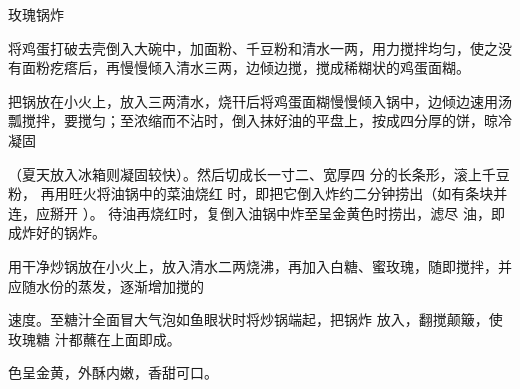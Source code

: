 \begin{recipe}{玫瑰锅炸}

\ingredients


\preparation

\step 将鸡蛋打破去壳倒入大碗中，加面粉、千豆粉和清水一两，用力搅拌均匀，使之没
有面粉疙瘩后，再慢慢倾入清水三两，边倾边搅，搅成稀糊状的鸡蛋面糊。

\step 把锅放在小火上，放入三两清水，烧幵后将鸡蛋面糊慢慢倾入锅中，边倾边速用汤
瓢搅拌，要搅匀；至浓缩而不沾时，倒入抹好油的平盘上，按成四分厚的饼，晾冷凝固

（夏天放入冰箱则凝固较快）。然后切成长一寸二、宽厚四 分的长条形，滚上千豆粉，
再用旺火将油锅中的菜油烧红 时，即把它倒入炸约二分钟捞出（如有条块并连，应掰开
）。 待油再烧红时，复倒入油锅中炸至呈金黄色时捞出，滤尽 油，即成炸好的锅炸。

\step 用干净炒锅放在小火上，放入清水二两烧沸，再加入白糖、蜜玫瑰，随即搅拌，并
应随水份的蒸发，逐渐增加搅的

速度。至糖汁全面冒大气泡如鱼眼状时将炒锅端起，把锅炸 放入，翻搅颠簸，使玫瑰糖
汁都蘸在上面即成。

\features

色呈金黄，外酥内嫩，香甜可口。

\end{recipe}

